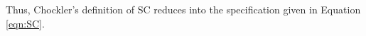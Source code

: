 \documentclass[acmlarge, ,11pt]{acmart}
\begin{document}
  Thus, Chockler's definition of SC reduces into the specification given in Equation \ref{eqn:SC}.
\end{document}
